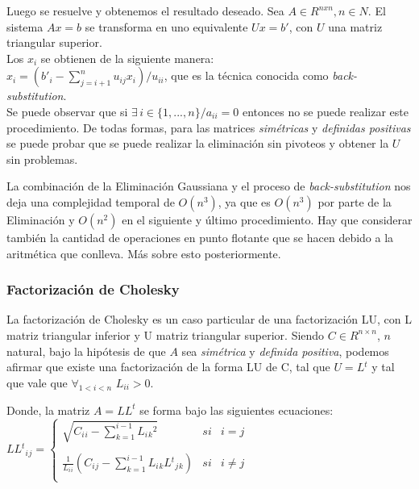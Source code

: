 Luego se resuelve y obtenemos el resultado deseado. Sea $A \in R^{nxn}, n \in N$. El sistema $Ax = b$ se transforma en uno equivalente $Ux = b'$, con $U$ una matriz triangular superior. \\

Los $x{_i}$ se obtienen de la siguiente manera: \\

$x{_i} = (b'{_i} - \sum\limits_{j = i + 1}^n u_{ij}x_{i}) / u_{ii}$, que es la técnica conocida como \textit{back-substitution}. \\

Se puede observar que si $\exists \, i \in \{1, ..., n\} / a_{ii} = 0$ entonces no se puede realizar este procedimiento. De todas formas, para las matrices \textit{sim\'etricas} y \textit{definidas positivas} se puede probar que se puede realizar la eliminaci\'on sin pivoteos y obtener la $U$ sin problemas.

La combinaci\'on de la Eliminaci\'on Gaussiana y el proceso de \textit{back-substitution} nos deja una complejidad temporal de $O(n^{3})$, ya que es $O(n^{3})$ por parte de la Eliminaci\'on y $O(n^{2})$ en el siguiente y \'ultimo procedimiento. Hay que considerar tambi\'en la cantidad de operaciones en punto flotante que se hacen debido a la aritm\'etica que conlleva. M\'as sobre esto posteriormente.

\subsubsection{Factorizaci\'on de Cholesky} \label{intro_cholesky}

La factorizaci\'on de Cholesky es un caso particular de una factorizaci\'on LU, con L matriz triangular inferior y U matriz triangular superior. Siendo $C \in R^{n \times n}$, $n$ natural, bajo la hip\'otesis de que $A$ sea \textit{sim\'etrica} y \textit{definida positiva}, podemos afirmar que existe una factorizaci\'on de la forma LU de C, tal que $U = L{^t}$ y tal que vale que $\displaystyle\mathop{\forall}_{1 < i < n}$ $L_{ii} > 0$.

Donde, la matriz $A = LL^{t}$ se forma bajo las siguientes ecuaciones: \\

$LL{^t}{_i}{_j} =
\left\{
	\begin{array}{lcc}
		\sqrt{C{_i}{_i} - \sum\limits_{k=1}^{i-1} L{_i}{_k}^2} & si & i = j \\
		\\ \frac{1}{L{_i}{_i}}(C{_i}{_j} - \sum\limits_{k=1}^{i-1} L{_i}{_k}L{^t}{_j}{_k}) & si & i \neq j \\
	\end{array}
\right.$ \\

